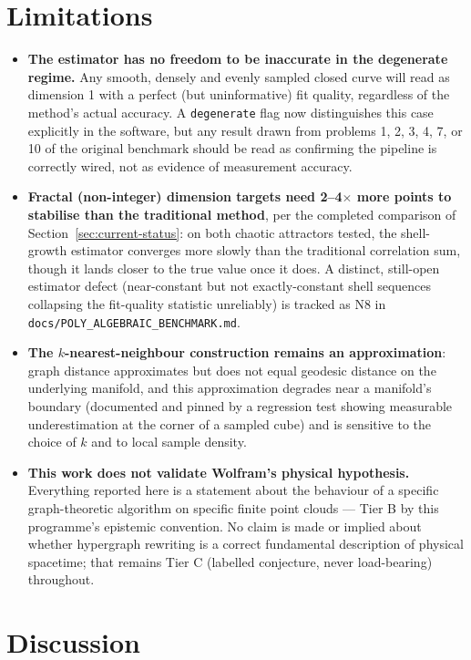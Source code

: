 \documentclass[11pt,a4paper]{article}
\begin{document}
\section{Limitations}
\label{sec:limitations}

\begin{itemize}
\item \textbf{The estimator has no freedom to be inaccurate in the
  degenerate regime.} Any smooth, densely and evenly sampled closed curve
  will read as dimension 1 with a perfect (but uninformative) fit quality,
  regardless of the method's actual accuracy. A \texttt{degenerate} flag
  now distinguishes this case explicitly in the software, but any result
  drawn from problems 1, 2, 3, 4, 7, or 10 of the original benchmark
  should be read as confirming the pipeline is correctly wired, not as
  evidence of measurement accuracy.
\item \textbf{Fractal (non-integer) dimension targets need 2--4$\times$
  more points to stabilise than the traditional method}, per the completed
  comparison of Section~\ref{sec:current-status}: on both chaotic
  attractors tested, the shell-growth estimator converges more slowly than
  the traditional correlation sum, though it lands closer to the true
  value once it does. A distinct, still-open estimator defect (near-constant
  but not exactly-constant shell sequences collapsing the fit-quality
  statistic unreliably) is tracked as N8 in
  \texttt{docs/POLY\_ALGEBRAIC\_BENCHMARK.md}.
\item \textbf{The $k$-nearest-neighbour construction remains an
  approximation}: graph distance approximates but does not equal geodesic
  distance on the underlying manifold, and this approximation degrades
  near a manifold's boundary (documented and pinned by a regression test
  showing measurable underestimation at the corner of a sampled cube) and
  is sensitive to the choice of $k$ and to local sample density.
\item \textbf{This work does not validate Wolfram's physical hypothesis.}
  Everything reported here is a statement about the behaviour of a
  specific graph-theoretic algorithm on specific finite point clouds ---
  Tier B by this programme's epistemic convention. No claim is made or
  implied about whether hypergraph rewriting is a correct fundamental
  description of physical spacetime; that remains Tier C (labelled
  conjecture, never load-bearing) throughout.
\end{itemize}

\section{Discussion}
\end{document}
